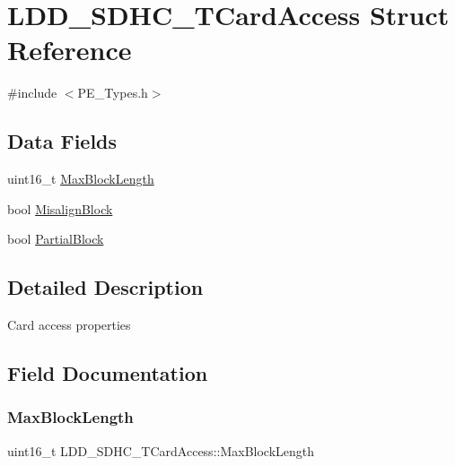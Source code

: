\hypertarget{struct_l_d_d___s_d_h_c___t_card_access}{}\section{L\+D\+D\+\_\+\+S\+D\+H\+C\+\_\+\+T\+Card\+Access Struct Reference}
\label{struct_l_d_d___s_d_h_c___t_card_access}


{\ttfamily \#include $<$P\+E\+\_\+\+Types.\+h$>$}

\subsection*{Data Fields}
\begin{DoxyCompactItemize}
\item 
uint16\+\_\+t \hyperlink{struct_l_d_d___s_d_h_c___t_card_access_aeeba296e7a8dc6164c925b816416ef2e}{Max\+Block\+Length}
\item 
bool \hyperlink{struct_l_d_d___s_d_h_c___t_card_access_aa56e65353fd03ffdbd8cc8d19537b621}{Misalign\+Block}
\item 
bool \hyperlink{struct_l_d_d___s_d_h_c___t_card_access_a9d78668915e934548a04351b20ec2d0a}{Partial\+Block}
\end{DoxyCompactItemize}


\subsection{Detailed Description}
Card access properties 

\subsection{Field Documentation}
\mbox{\label{struct_l_d_d___s_d_h_c___t_card_access_aeeba296e7a8dc6164c925b816416ef2e}} 
\subsubsection{\texorpdfstring{Max\+Block\+Length}{MaxBlockLength}}
{\footnotesize\ttfamily uint16\+\_\+t L\+D\+D\+\_\+\+S\+D\+H\+C\+\_\+\+T\+Card\+Access\+::\+Max\+Block\+Length}

